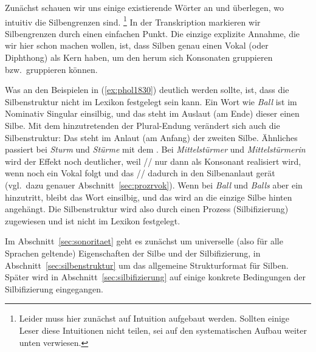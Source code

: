 Zunächst schauen wir uns einige existierende Wörter an und überlegen, wo intuitiv die Silbengrenzen sind.%
\footnote{Leider muss hier zunächst auf Intuition aufgebaut werden.
Sollten einige Leser diese Intuitionen nicht teilen, sei auf den systematischen Aufbau weiter unten verwiesen.}
In der Transkription markieren wir Silbengrenzen durch einen einfachen Punkt.
Die einzige explizite Annahme, die wir hier schon machen wollen, ist, dass Silben genau einen Vokal (oder Diphthong) als Kern haben, um den herum sich Konsonaten gruppieren bzw.\ gruppieren können.

\begin{exe}
  \ex\label{ex:phol1830}
  \begin{xlist}
  \end{xlist}
\end{exe}

Was an den Beispielen in (\ref{ex:phol1830}) deutlich werden sollte, ist, dass die Silbenstruktur nicht im Lexikon festgelegt sein kann.
Ein Wort wie \textit{Ball} ist im Nominativ Singular einsilbig, und das \textipa{[l]} steht im Auslaut (am Ende) dieser einen Silbe.
Mit dem hinzutretenden \textipa{[@]} der Plural-Endung verändert sich auch die Silbenstruktur:
Das \textipa{[l]} steht im Anlaut (am Anfang) der zweiten Silbe.
Ähnliches passiert bei \textit{Sturm} und \textit{Stürme} mit dem \textipa{[m]}.
Bei \textit{Mittelstürmer}  und \textit{Mittelstürmerin}  wird der Effekt noch deutlicher, weil // nur dann als Konsonant \textipa{[K]} realisiert wird, wenn noch ein Vokal folgt und das // dadurch in den Silbenanlaut gerät (vgl.\ dazu genauer Abschnitt~\ref{sec:prozrvok}).
Wenn bei \textit{Ball} und \textit{Balls} aber ein \textipa{[s]} hinzutritt, bleibt das Wort einsilbig, und das \textipa{[s]} wird an die einzige Silbe hinten angehängt.
Die Silbenstruktur wird also durch einen Prozess (Silbifizierung) zugewiesen und ist nicht im Lexikon festgelegt.

Im Abschnitt~\ref{sec:sonoritaet} geht es zunächst um universelle (also für alle Sprachen geltende) Eigenschaften der Silbe und der Silbifizierung, in Abschnitt~\ref{sec:silbenstruktur} um das allgemeine Strukturformat für Silben.
Später wird in Abschnitt~\ref{sec:silbifizierung} auf einige konkrete Bedingungen der Silbifizierung eingegangen.

